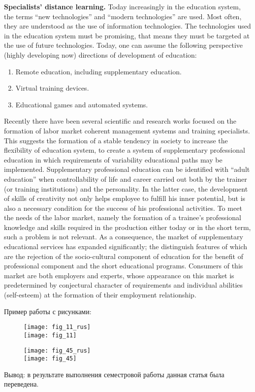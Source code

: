 \textbf{Specialists’ distance learning.} Today increasingly in the education system, the terms ``new technologies'' and ``modern technologies'' are used. Most often, they are understood as the use of information technologies. The technologies used in the education system must be promising, that means they must be targeted at the use of future technologies. Today, one can assume the following perspective (highly developing now) directions of development of education:
\begin{enumerate}
\item Remote education, including supplementary education.
\item Virtual training devices.
\item Educational games and automated systems. 
\end{enumerate}
Recently there have been several scientific and research works focused on the formation of labor market coherent management systems and training specialists. This suggests the formation of a stable tendency in society to increase the flexibility of education system, to create a system of supplementary professional education in which requirements of variability educational paths may be implemented.
Supplementary professional education can be identified with ``adult education'' when controllability of life and career carried out both by the trainer (or training institutions) and the personality. In the latter case, the development of skills of creativity not only helps employee to fulfill his inner potential, but is also a necessary condition for the success of his professional activities.
To meet the needs of the labor market, namely the formation of a trainee’s professional knowledge and skills required in the production either today or in the short term, such a problem is not relevant. As a consequence, the market of supplementary educational services has expanded significantly; the distinguish features of which are the rejection of the socio-cultural component of education for the benefit of professional component and the short educational programs. Consumers of this market are both employers and experts, whose appearance on this market is predetermined by conjectural character of requirements and individual abilities (self-esteem) at the formation of their employment relationship.

\newpage

\normalsize
Пример работы с рисунками:
\begin{figure}[h!]
  \center
  \texttt{[image: fig\_11\_rus]} \\[.7em]
  \texttt{[image: fig\_11]}
\end{figure}

\newpage

\begin{figure}[h!]
  \center
  \texttt{[image: fig\_45\_rus]} \\[.3em]
  \texttt{[image: fig\_45]}
\end{figure}

Вывод: в результате выполнения семестровой работы данная статья была переведена.